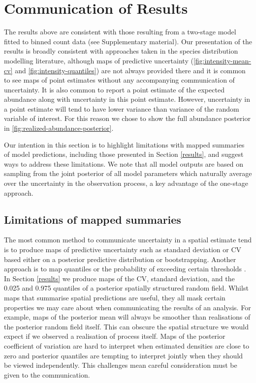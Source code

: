 \documentclass{stylefile16/statsoc}
\begin{document}

\clearpage %

\section{Communication of Results}
\label{sec-comms}

The results above are consistent with those resulting from a two-stage model fitted to binned count data (see Supplementary material).  Our presentation of the results is broadly consistent with approaches taken in the species distribution modelling literature, although maps of predictive uncertainty (\autoref{fig:intensity-mean-cv} and \autoref{fig:intensity-quantiles}) are not always provided there and it is common to see maps of point estimates without any accompanying communication of uncertainty.  It is also common to report a point estimate of the expected abundance along with uncertainty in this point estimate.  However, uncertainty in a point estimate will tend to have lower variance than variance of the random variable of interest.  For this reason we chose to show the full abundance posterior in \autoref{fig:realized-abundance-posterior}.

Our intention in this section is to highlight limitations with mapped summaries of model predictions, including those presented in Section \ref{results}, and suggest ways to address these limitations.  We note that all model outputs are based on sampling from the joint posterior of all model parameters which naturally average over the uncertainty in the observation process, a key advantage of the one-stage approach.

\subsection{Limitations of mapped summaries}

The most common method to communicate uncertainty in a spatial estimate tend is to produce maps of predictive uncertainty such as standard deviation or CV \citep{fuller_novel_2018, vallejo_responses_2017,bradbury_mapping_2014} based either on a posterior predictive distribution or bootstrapping.  Another approach is to map quantiles or the probability of exceeding certain thresholds \citep{russell_avoidance_2016, wilson_hierarchical_2010}.  In Section \ref{results} we produce maps of the CV, standard deviation, and the 0.025 and 0.975 quantiles of a posterior spatially structured random field.  Whilst maps that summarise spatial predictions are useful, they all mask certain properties we may care about when communicating the results of an analysis.  For example, maps of the posterior mean will always be smoother than realisations of the posterior random field itself.  This can obscure the spatial structure we would expect if we observed a realisation of process itself.  Maps of the posterior coefficient of variation are hard to interpret when estimated densities are close to zero and posterior quantiles are tempting to interpret jointly when they should be viewed independently.  This challenges mean careful consideration must be given to the communication.
\end{document}
